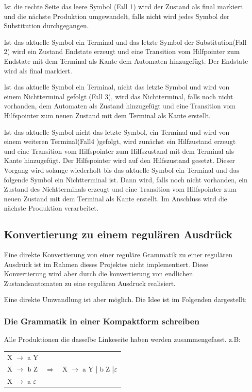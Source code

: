 Ist die rechte Seite das leere Symbol (Fall 1) wird der Zustand als final
markiert und die nächste Produktion umgewandelt, falls nicht wird jedes Symbol
der Substitution durchgegangen.

Ist das aktuelle Symbol ein Terminal und das letzte Symbol der Substitution(Fall 2)
wird ein Zustand Endstate erzeugt und eine Transition vom Hilfpointer zum Endstate
mit dem Terminal als Kante dem Automaten hinzugefügt. Der Endstate wird als
final markiert.

Ist das aktuelle Symbol ein Terminal, nicht das letzte Symbol und wird von einem
Nichtterminal gefolgt (Fall 3), wird das Nichtterminal, falls noch nicht vorhanden,
dem Automaten als Zustand hinzugefügt und eine Transition vom Hilfspointer zum
neuen Zustand mit dem Terminal als Kante erstellt.

Ist das aktuelle Symbol nicht das letzte Symbol, ein Terminal und wird von einem
weiteren Terminal(Fall4 )gefolgt, wird zunächst ein Hilfzustand erzeugt und eine
Transition vom Hilfspointer zum Hilfszustand mit dem Terminal als Kante
hinzugefügt. Der Hilfspointer wird auf den Hilfszustand gesetzt. Dieser Vorgang wird
solange wiederholt bis das aktuelle Symbol ein Terminal und das folgende Symbol ein
Nichtterminal ist. Dann wird, falls noch nicht vorhanden, ein Zustand des
Nichtterminals erzeugt und eine Transition vom Hilfspointer zum neuen Zustand mit
dem Terminal als Kante erstellt. Im Anschluss wird die nächste Produktion
verarbeitet.

\subsection{Konvertierung zu einem regulären Ausdrück}

Eine direkte Konvertierung von einer reguläre Grammatik zu einer regulären
Ausdrück ist im Rahmen dieses Projektes nicht implementiert. Diese Konvertierung
wird aber durch die konvertierung von endlichen Zustandsautomaten zu eine
regulären Ausdruck realisiert.

Eine direkte Umwandlung ist aber möglich. Die Idee ist im Folgenden dargestellt:
\subsubsection{Die Grammatik in einer Kompaktform schreiben}
Alle Produktionen die dasselbe Linkeseite haben werden zusammengefasst. z.B:

\begin{tabular}{lcr}

X $\rightarrow$ a Y & & \\
X $\rightarrow$ b Z & $\Longrightarrow$ & X $\rightarrow$ a Y | b Z
|$\varepsilon$\\
X $\rightarrow$ a $\varepsilon$ & &\\
 
\end{tabular}


